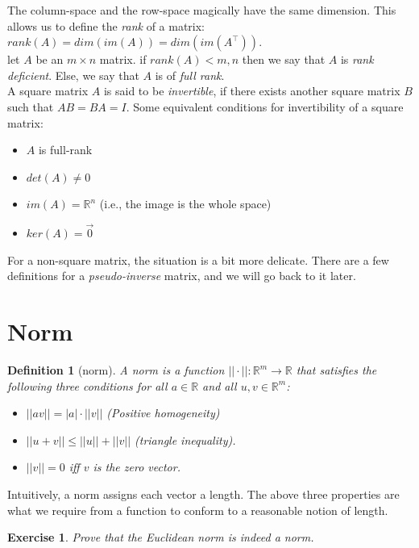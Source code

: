 \documentclass[11pt, oneside]{article}   	%
\newtheorem{definition}[lemma]{Definition}
\newtheorem{exercise}{Exercise}
\begin{document}
The column-space and the row-space magically have the same dimension. This allows us to define the \textit{rank} of a matrix:  $rank(A) = dim(im(A)) = dim(im(A^\top))$.\\
let $A$ be an $m\times n$ matrix. if $rank (A)<m,n$ then we say that $A$ is \textit{rank deficient}. Else, we say that $A$ is of \textit{full rank}.\\
A square matrix $A$ is said to be \textit{invertible}, if there exists another square matrix $B$ such that $AB=BA=I$.
Some equivalent conditions for invertibility of a square matrix:
\begin{itemize}
\item $A$ is full-rank
\item $det(A)\neq 0$
\item $im(A)=\mathbb R^n$ (i.e., the image is the whole space)
\item $ker(A)=\vec 0$
\end{itemize}
For a non-square matrix, the situation is a bit more delicate. There are a few definitions for a \emph{pseudo-inverse} matrix, and we will go back to it later.

\pagebreak
\section{Norm}


\begin{definition}[norm] 
A \emph{norm} is a function $||\cdot||:\mathbb{R}^m \rightarrow \mathbb{R}$ that satisfies the following three conditions for all $a \in \mathbb{R}$ and all $u, v \in \mathbb{R}^m$:
\begin{itemize}
\item $||av|| = |a|\cdot ||v||$ (Positive homogeneity)
\item $||u + v|| \leq ||u|| + ||v||$ (triangle inequality).
\item $||v|| = 0$ iff $v$ is the zero vector.
\end{itemize}
\end{definition}
Intuitively, a norm assigns each vector a length.
The above three properties are what we require from a function to conform to a reasonable notion of length.

\begin{exercise} Prove that the Euclidean norm is indeed a norm.  \end{exercise}
\end{document}
